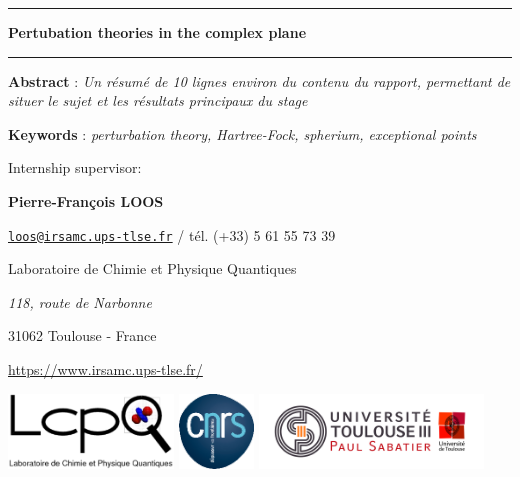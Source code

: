 \documentclass[11pt,a4paper]{article}
\begin{document}
\begin{center}

\vspace{1.5cm}

\rule[11pt]{5cm}{0.5pt}

\textbf{\huge Pertubation theories in the complex plane}

\rule{5cm}{0.5pt}

\vspace{1.5cm}

\parbox{15cm}{\small
\textbf{Abstract} : \it Un résumé de 10 lignes environ du contenu du rapport, permettant de situer le sujet et les résultats principaux du stage
}

\parbox{15cm}{
\textbf{Keywords} : \it perturbation theory, Hartree-Fock, spherium, exceptional points
} %

\vspace{0.5cm}

\parbox{15cm}{
Internship supervisor:

{\bf Pierre-François \textsc{LOOS}}

\href{mailto:loos@irsamc.ups-tlse.fr}{\tt loos@irsamc.ups-tlse.fr} / tél. (+33) 5 61 55 73 39

Laboratoire de Chimie et Physique Quantiques

{\it 118, route de Narbonne

31062 Toulouse - France}

\url{https://www.irsamc.ups-tlse.fr/}
} %

\vspace{0.5cm}
\includegraphics[height=2cm]{LCPQ_logo.pdf} \hfill \includegraphics[height=2cm]{LogoCNRS.eps} \hfill \includegraphics[height=2cm]{UPS_logo.jpg}

\end{center}
\end{document}
